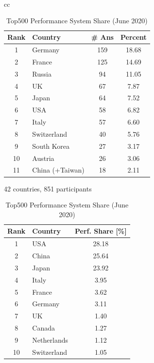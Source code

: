 \documentclass[sigconf,nonacm]{acmart}
\begin{document}
\begin{table}[htb]%
\scriptsize
\begin{center}%
\begin{tabular}[t]{cc}

\begin{minipage}[t]{0.5\hsize}
\begin{center}%
\caption{\small Top 10 Countries of Participants}
\label{tab:countries}%
\begin{tabular}{c|l|c|c}%
\hline%
Rank & Country & \# Ans & Percent \\%
\hline%
1 & Germany 	& 159 & 18.68 \\%
2 & France 	& 125 & 14.69 \\%
3 & Russia 	& 94  & 11.05 \\%
4 & UK 		& 67  &  7.87 \\%
5 & Japan 	& 64  &  7.52 \\%
6 & USA 	& 58  &  6.82 \\%
7 & Italy 	& 57  &  6.60 \\%
\hline
8 & Switzerland & 40  &  5.76 \\%
9 & South Korea & 27  &  3.17 \\%
10 & Austria 	& 26  &  3.06 \\%
11 & China (+Taiwan) & 18 & 2.11 \\
\hline%
\end{tabular}%

42 countries, 851 participants\\%
\end{center}%
\end{minipage}

\hspace{1mm}

\begin{minipage}[t]{0.5\hsize}
\begin{center}%
\caption{\small Top500 Performance System Share (June 2020)\cite{Top500}}
\label{tab:top500-share}%
\begin{tabular}{c|l|c}%
\hline%
Rank & Country & Perf. Share [\%] \\%
\hline%
1  & USA 	  & 28.18 \\%
2  & China 	  & 25.64 \\%
3  & Japan 	  & 23.92 \\%
4  & Italy	  & 3.95  \\%
5  & France	  & 3.62  \\%
6  & Germany 	  & 3.11  \\%
7  & UK		  & 1.40  \\%
8  & Canada	  & 1.27  \\%
9  & Netherlands  & 1.12  \\%
10  & Switzerland  & 1.05  \\%
\hline%
\end{tabular}%
\end{center}%
\end{minipage}%

\end{tabular}%
\end{center}%
\end{table}%
\end{document}

